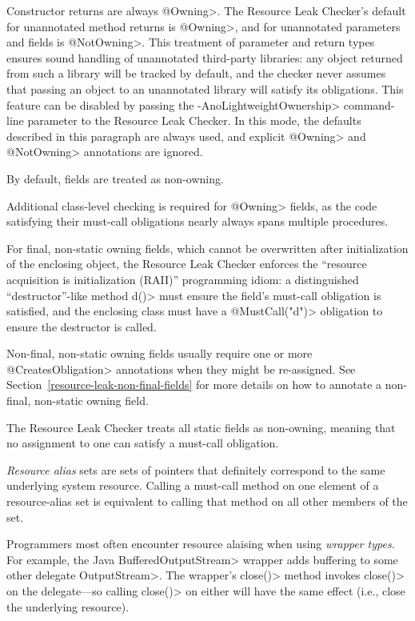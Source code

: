 Constructor returns are always \<@Owning>.
The Resource Leak Checker's default for unannotated method returns is \<@Owning>,
and for unannotated parameters and fields is \<@NotOwning>. This treatment of parameter and
return types ensures sound handling of unannotated third-party libraries: any
object returned from such a library will be tracked by default, and the checker
never assumes that passing an object to an unannotated library will satisfy its obligations.
This feature can be disabled by passing the \<-AnoLightweightOwnership> command-line parameter to the Resource
Leak Checker. In this mode, the defaults described in this paragraph are always used, and explicit \<@Owning>
and \<@NotOwning> annotations are ignored.


By default, fields are treated as non-owning.

Additional class-level checking is required for \<@Owning>
fields, as the code
satisfying their must-call obligations nearly always spans multiple
procedures.

For final, non-static owning fields,
which cannot be overwritten after initialization of the enclosing
object, the Resource Leak Checker enforces the ``resource acquisition is
initialization (RAII)'' programming idiom: a distinguished
``destructor''-like method \<d()> must ensure the field's must-call obligation is
satisfied, and the enclosing class must have a \<@MustCall("d")> obligation to
ensure the destructor is called.

Non-final, non-static owning fields usually require one or more \<@CreatesObligation> annotations
when they might be re-assigned. See Section~\ref{resource-leak-non-final-fields} for
more details on how to annotate a non-final, non-static owning field.

The Resource Leak Checker treats all static fields as non-owning, meaning that no assignment to one
can satisfy a must-call obligation.


\emph{Resource alias} sets are sets of pointers that
definitely correspond to the same underlying system resource.
Calling a must-call method on one element of a resource-alias set
is equivalent to calling that method on all other members of the set.

Programmers most often encounter resource alaising when using \emph{wrapper types}.
For example, the Java \<BufferedOutputStream> wrapper adds buffering to some other delegate \<OutputStream>.
The wrapper's \<close()> method invokes \<close()> on the delegate---so calling \<close()> on either
will have the same effect (i.e., close the underlying resource).

